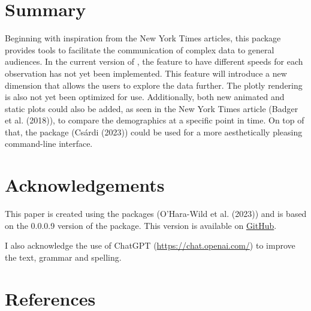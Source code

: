 \hypertarget{summary}{%
\section{Summary}\label{summary}}

Beginning with inspiration from the New York Times articles, this package provides tools to facilitate the communication of complex data to general audiences. In the current version of , the feature to have different speeds for each observation has not yet been implemented. This feature will introduce a new dimension that allows the users to explore the data further. The plotly rendering is also not yet been optimized for use. Additionally, both new animated and static plots could also be added, as seen in the New York Times article (Badger et al. (2018)), to compare the demographics at a specific point in time. On top of that, the  package (Csárdi (2023)) could be used for a more aesthetically pleasing command-line interface.

\hypertarget{acknowledgements}{%
\section*{Acknowledgements}\label{acknowledgements}}

This paper is created using the  packages (O'Hara-Wild et al. (2023)) and is based on the 0.0.0.9 version of the  package. This version is available on \href{https://github.com/KrisanatA/animbook}{GitHub}.

I also acknowledge the use of ChatGPT (\url{https://chat.openai.com/}) to improve the text, grammar and spelling.

\hypertarget{references}{%
\section*{References}\label{references}}

